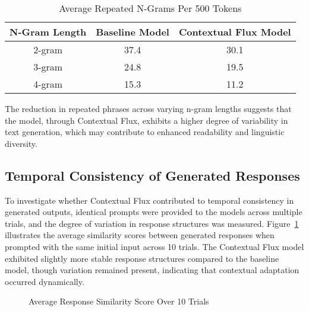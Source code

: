 \documentclass{article}
\begin{document}
\begin{table}[h]
	\centering
	\caption{Average Repeated N-Grams Per 500 Tokens}
	\label{tab:redundancy}
	\begin{tabular}{|c|c|c|}
		\hline
		\textbf{N-Gram Length} & \textbf{Baseline Model} & \textbf{Contextual Flux Model} \\
		\hline
		2-gram & 37.4 & 30.1 \\
		3-gram & 24.8 & 19.5 \\
		4-gram & 15.3 & 11.2 \\
		\hline
	\end{tabular}
\end{table}

The reduction in repeated phrases across varying n-gram lengths suggests that the model, through Contextual Flux, exhibits a higher degree of variability in text generation, which may contribute to enhanced readability and linguistic diversity.

\subsection{Temporal Consistency of Generated Responses}

To investigate whether Contextual Flux contributed to temporal consistency in generated outputs, identical prompts were provided to the models across multiple trials, and the degree of variation in response structures was measured. Figure~\ref{fig:temporal_consistency} illustrates the average similarity scores between generated responses when prompted with the same initial input across 10 trials. The Contextual Flux model exhibited slightly more stable response structures compared to the baseline model, though variation remained present, indicating that contextual adaptation occurred dynamically.

\begin{figure}[h]
	\centering
	\caption{Average Response Similarity Score Over 10 Trials}
	\label{fig:temporal_consistency}
\end{figure}
\end{document}
